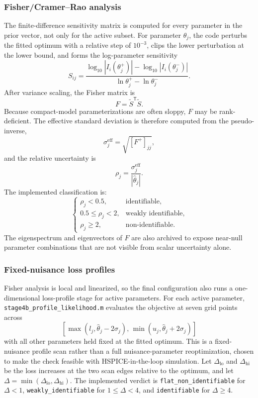 \documentclass[journal]{IEEEtran}
\begin{document}
\subsubsection{Fisher/Cramer--Rao analysis}
The finite-difference sensitivity matrix is computed for every parameter in
the prior vector, not only for the active subset.  For parameter $\theta_j$,
the code perturbs the fitted optimum with a relative step of $10^{-3}$,
clips the lower perturbation at the lower bound, and forms the log-parameter
sensitivity
\begin{equation}
  S_{ij}
  =
  \frac{
  \log_{10}|I_i(\theta_j^+)|
  -\log_{10}|I_i(\theta_j^-)|}
  {\ln\theta_j^+ - \ln\theta_j^-}.
  \label{eq:sensitivity}
\end{equation}
After variance scaling, the Fisher matrix is
\begin{equation}
  F = \widetilde S^{\mathsf T}\widetilde S.
  \label{eq:fisher}
\end{equation}
Because compact-model parameterizations are often sloppy, $F$ may be
rank-deficient.  The effective standard deviation is therefore computed from
the pseudo-inverse,
\[
  \sigma_j^{\mathrm{eff}} = \sqrt{[F^+]_{jj}},
\]
and the relative uncertainty is
\[
  \rho_j =
  \frac{\sigma_j^{\mathrm{eff}}}{|\hat{\theta}_j|}.
\]
The implemented classification is:
\[
\begin{cases}
\rho_j < 0.5, & \text{identifiable},\\
0.5 \le \rho_j < 2, & \text{weakly identifiable},\\
\rho_j \ge 2, & \text{non-identifiable}.
\end{cases}
\]
The eigenspectrum and eigenvectors of $F$ are also archived to expose
near-null parameter combinations that are not visible from scalar uncertainty
alone.

\subsubsection{Fixed-nuisance loss profiles}
Fisher analysis is local and linearized, so the final configuration also runs
a one-dimensional loss-profile stage for active parameters.  For each active
parameter, \texttt{stage4b\_profile\_likelihood.m} evaluates the objective at
seven grid points across
\[
  [\max(l_j,\hat{\theta}_j-2\sigma_j),\,
    \min(u_j,\hat{\theta}_j+2\sigma_j)]
\]
with all other parameters held fixed at the fitted optimum.  This is a
fixed-nuisance profile scan rather than a full nuisance-parameter reoptimization,
chosen to make the check feasible with HSPICE-in-the-loop simulation.  Let
$\Delta_{\mathrm{lo}}$ and $\Delta_{\mathrm{hi}}$ be the loss increases at the
two scan edges relative to the optimum, and let
$\Delta=\min(\Delta_{\mathrm{lo}},\Delta_{\mathrm{hi}})$.  The implemented
verdict is \texttt{flat\_non\_identifiable} for $\Delta<1$,
\texttt{weakly\_identifiable} for $1\le\Delta<4$, and
\texttt{identifiable} for $\Delta\ge4$.
\end{document}
